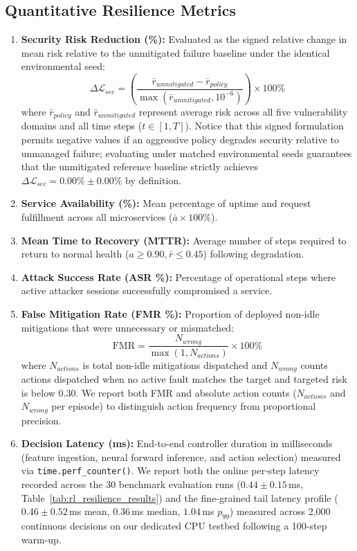\documentclass[11pt,a4paper]{article}
\begin{document}
\subsection{Quantitative Resilience Metrics}
\begin{enumerate}
    \item \textbf{Security Risk Reduction (\%):} Evaluated as the signed relative change in mean risk relative to the unmitigated failure baseline under the identical environmental seed:
    \begin{equation}
        \label{eq:risk_reduction}
        \Delta \mathcal{L}_{sec} = \left(\frac{\bar{r}_{unmitigated} - \bar{r}_{policy}}{\max(\bar{r}_{unmitigated}, 10^{-6})}\right) \times 100\%
    \end{equation}
    where $\bar{r}_{policy}$ and $\bar{r}_{unmitigated}$ represent average risk across all five vulnerability domains and all time steps ($t \in [1, T]$). Notice that this signed formulation permits negative values if an aggressive policy degrades security relative to unmanaged failure; evaluating under matched environmental seeds guarantees that the unmitigated reference baseline strictly achieves $\Delta \mathcal{L}_{sec} = 0.00\% \pm 0.00\%$ by definition.
    \item \textbf{Service Availability (\%):} Mean percentage of uptime and request fulfillment across all microservices ($\bar{a} \times 100\%$).
    \item \textbf{Mean Time to Recovery (MTTR):} Average number of steps required to return to normal health ($a \ge 0.90, \bar{r} \le 0.45$) following degradation.
    \item \textbf{Attack Success Rate (ASR \%):} Percentage of operational steps where active attacker sessions successfully compromised a service.
    \item \textbf{False Mitigation Rate (FMR \%):} Proportion of deployed non-idle mitigations that were unnecessary or mismatched:
    \begin{equation}
        \label{eq:fmr}
        \text{FMR} = \frac{N_{wrong}}{\max(1, N_{actions})} \times 100\%
    \end{equation}
    where $N_{actions}$ is total non-idle mitigations dispatched and $N_{wrong}$ counts actions dispatched when no active fault matches the target and targeted risk is below $0.30$. We report both FMR and absolute action counts ($N_{actions}$ and $N_{wrong}$ per episode) to distinguish action frequency from proportional precision.
    \item \textbf{Decision Latency (ms):} End-to-end controller duration in milliseconds (feature ingestion, neural forward inference, and action selection) measured via \texttt{time.perf\_counter()}. We report both the online per-step latency recorded across the 30 benchmark evaluation runs ($0.44 \pm 0.15$\,ms, Table~\ref{tab:rl_resilience_results}) and the fine-grained tail latency profile ($0.46 \pm 0.52$\,ms mean, $0.36$\,ms median, $1.04$\,ms $p_{99}$) measured across 2,000 continuous decisions on our dedicated CPU testbed following a 100-step warm-up.

\end{enumerate}
\end{document}
